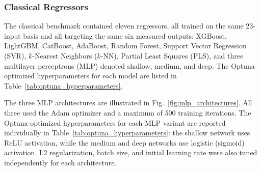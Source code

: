 \documentclass[11pt]{article}
\begin{document}
\subsubsection{Classical Regressors}

The classical benchmark contained eleven regressors, all trained on the same 23-input basis and all targeting the same six measured outputs: XGBoost, LightGBM, CatBoost, AdaBoost, Random Forest, Support Vector Regression (SVR), $k$-Nearest Neighbors ($k$-NN), Partial Least Squares (PLS), and three multilayer perceptrons (MLP) denoted shallow, medium, and deep. The Optuna-optimized hyperparameters for each model are listed in Table~\ref{tab:optuna_hyperparameters}.

The three MLP architectures are illustrated in Fig.~\ref{fig:mlp_architectures}. All three used the Adam optimizer and a maximum of 500 training iterations. The Optuna-optimized hyperparameters for each MLP variant are reported individually in Table~\ref{tab:optuna_hyperparameters}: the shallow network uses ReLU activation, while the medium and deep networks use logistic (sigmoid) activation. L2 regularization, batch size, and initial learning rate were also tuned independently for each architecture.
\end{document}
